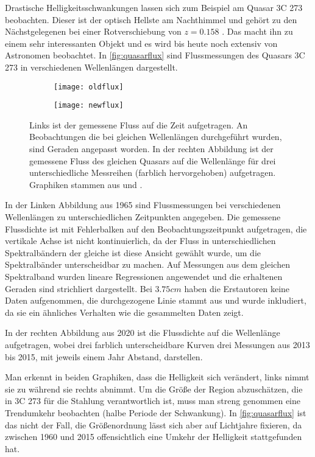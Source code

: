 Drastische Helligkeitsschwankungen lassen sich zum Beispiel am Quasar 3C 273 beobachten. Dieser ist der optisch Hellste am Nachthimmel und gehört zu den Nächstgelegenen bei einer Rotverschiebung von \( z = 0.158 \) \autocite{3c273}. Das macht ihn zu einem sehr interessanten Objekt und es wird bis heute noch extensiv von Astronomen beobachtet. In \autoref{fig:quasarflux} sind Flussmessungen des Quasars 3C 273 in verschiedenen Wellenlängen dargestellt.

\begin{figure}[H]
	\centering
	\begin{subfigure}{.45\textwidth}
		\centering
		\texttt{[image: oldflux]}
	\end{subfigure}%
	\begin{subfigure}{.55\textwidth}
		\centering
		\texttt{[image: newflux]}
	\end{subfigure}
	\caption{Links ist der gemessene Fluss auf die Zeit aufgetragen. An Beobachtungen die bei gleichen Wellenlängen durchgeführt wurden, sind Geraden angepasst worden. In der rechten Abbildung ist der gemessene Fluss des gleichen Quasars auf die Wellenlänge für drei unterschiedliche Messreihen (farblich hervorgehoben) aufgetragen. Graphiken stammen aus \autocite{oldflux} und \autocite{newflux}.}
	\label{fig:quasarflux}
\end{figure}

In der Linken Abbildung aus 1965 \autocite{oldflux} sind Flussmessungen bei verschiedenen Wellenlängen zu unterschiedlichen Zeitpunkten angegeben. Die gemessene Flussdichte ist mit Fehlerbalken auf den Beobachtungszeitpunkt aufgetragen, die vertikale Achse ist nicht kontinuierlich, da der Fluss in unterschiedlichen Spektralbändern der gleiche ist diese Ansicht gewählt wurde, um die Spektralbänder unterscheidbar zu machen. Auf Messungen aus dem gleichen Spektralband wurden lineare Regressionen angewendet und die erhaltenen Geraden sind strichliert dargestellt. Bei \( 3.75 \unit{cm} \) haben die Erstautoren keine Daten aufgenommen, die durchgezogene Linie stammt aus \autocite{other} und wurde inkludiert, da sie ein ähnliches Verhalten wie die gesammelten Daten zeigt.

In der rechten Abbildung aus 2020 \autocite{newflux} ist die Flussdichte auf die Wellenlänge aufgetragen, wobei drei farblich unterscheidbare Kurven drei Messungen aus 2013 bis 2015, mit jeweils einem Jahr Abstand, darstellen. 

Man erkennt in beiden Graphiken, dass die Helligkeit sich verändert, links nimmt sie zu während sie rechts abnimmt. Um die Größe der Region abzuschätzen, die in 3C 273 für die Stahlung verantwortlich ist, muss man streng genommen eine Trendumkehr beobachten (halbe Periode der Schwankung). In \autoref{fig:quasarflux} ist das nicht der Fall, die Größenordnung lässt sich aber auf Lichtjahre fixieren, da zwischen 1960 und 2015 offensichtlich eine Umkehr der Helligkeit stattgefunden hat. 

